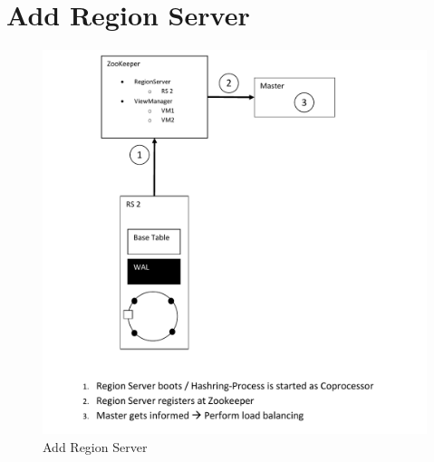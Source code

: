 \section{Add Region Server}
\begin{figure}[h!]
  \centering
    \includegraphics[scale=0.8]{figures/SO_AddRegionServer}
     \caption{Add Region Server}
    \label{fig:addregionserver}
\end{figure}
\newpage

